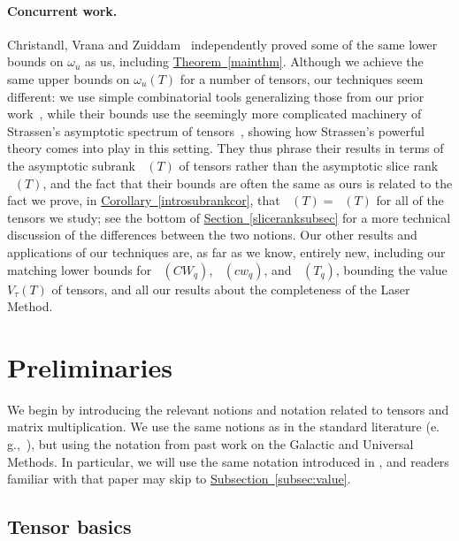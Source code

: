 \documentclass[11pt]{article}
\numberwithin{equation}{section}
\theoremstyle{definition}
\theoremstyle{plain}
\newcommand{\eg}{e.\,g.}
\newcommand{\expref}[2]{\hyperref[#2]{#1~\ref{#2}}}
\newcommand{\tsr}{\mathop{\tilde{\operatorname{S}}}}
\newcommand{\tqr}{\mathop{\tilde{\operatorname{Q}}}}
\theoremstyle{definition}
\begin{document}
%
\paragraph{Concurrent work.} Christandl, Vrana and Zuiddam~\cite{theirpreprint} independently proved some of the same lower bounds on $\omega_u$ as us, including \expref{Theorem}{mainthm}.
Although we achieve the same upper bounds on $\omega_u(T)$ for a number of tensors, our techniques seem different: we use simple combinatorial tools generalizing those from our prior work~\cite{aw}, 
while their bounds use the seemingly more complicated machinery of Strassen's asymptotic spectrum of tensors~\cite{strassen1991degeneration}, showing how Strassen's powerful theory comes into play in this setting. They thus phrase their results in terms of the asymptotic subrank $\tqr(T)$ of tensors rather than the asymptotic slice rank $\tsr(T)$, and the fact that their bounds are often the same as ours is related to the fact we prove, in \expref{Corollary}{introsubrankcor}, that $\tqr(T) = \tsr(T)$ for all of the tensors we study; see the bottom of \expref{Section}{sliceranksubsec} for a more technical discussion of the differences between the two notions. Our other results and applications of our techniques are, as far as we know, entirely new, including our matching lower bounds for $\tsr(CW_q)$, $\tsr(cw_q)$, and $\tsr(T_q)$, bounding the value $V_\tau(T)$ of tensors, and all our results about the completeness of the Laser Method.





\section{Preliminaries} \label{sectwo}

We begin by introducing the relevant notions and notation related to tensors and matrix multiplication. We use the same notions as in the standard literature (\eg,~\cite{laser,blaser,burgisser2013algebraic}), but using the notation from past work on the Galactic and Universal Methods. In particular, we will use the same notation introduced in \cite[Section~3]{aw}, and readers familiar with that paper may skip to \expref{Subsection}{subsec:value}.

%
\subsection{Tensor basics}
\end{document}
